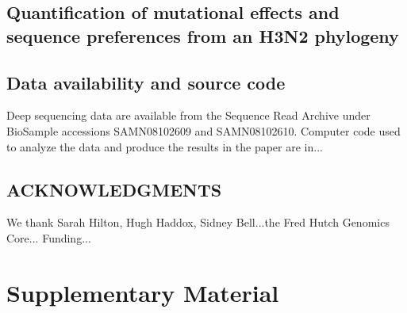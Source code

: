 \documentclass[11pt]{article}
\begin{document}
\subsection*{Quantification of mutational effects and sequence preferences from an H3N2 phylogeny}

\subsection*{Data availability and source code}
Deep sequencing data are available from the Sequence Read Archive under BioSample accessions SAMN08102609 and SAMN08102610. Computer code used to analyze the data and produce the results in the paper are in...


\subsection*{ACKNOWLEDGMENTS}
We thank Sarah Hilton, Hugh Haddox, Sidney Bell...the Fred Hutch Genomics Core...
Funding...





\clearpage
\normalsize

\section*{Supplementary Material}
\FloatBarrier
{}%
\renewcommand*{\thepage}{S\arabic{page}}
\end{document}
